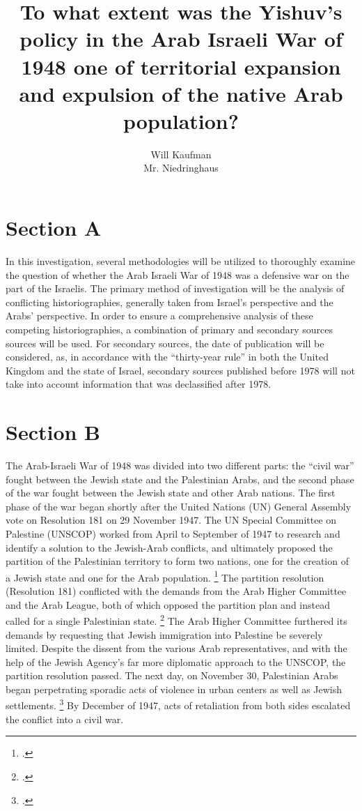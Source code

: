 \documentclass{turabian-researchpaper}
\begin{document}
\title{To what extent was the Yishuv's policy in the Arab Israeli War of 1948 one of territorial expansion and expulsion of the native Arab population?}

\author{Will Kaufman \\ Mr. Niedringhaus}
\maketitle

\section{Section A}
In this investigation, several methodologies will be utilized to thoroughly examine the question of whether the Arab Israeli War of 1948 was a defensive war on the part of the Israelis.  The primary method of investigation will be the analysis of conflicting historiographies, generally taken from Israel's perspective and the Arabs' perspective.  In order to ensure a comprehensive analysis of these competing historiographies, a combination of primary and secondary sources sources will be used.  For secondary sources, the date of publication will be considered, as, in accordance with the “thirty-year rule” in both the United Kingdom and the state of Israel, secondary sources published before 1978 will not take into account information that was declassified after 1978.

\section{Section B}
The Arab-Israeli War of 1948 was divided into two different parts: the “civil war” fought between the Jewish state and the Palestinian Arabs, and the second phase of the war fought between the Jewish state and other Arab nations.  The first phase of the war began shortly after the United Nations (UN) General Assembly vote on Resolution 181 on 29 November 1947.  The UN Special Committee on Palestine (UNSCOP) worked from April to September of 1947 to research and identify a solution to the Jewish-Arab conflicts, and ultimately proposed the partition of the Palestinian territory to form two nations, one for the creation of a Jewish state and one for the Arab population.
\footcite[22]{pappe}
The partition resolution (Resolution 181) conflicted with the demands from the Arab Higher Committee and the Arab League, both of which opposed the partition plan and instead called for a single Palestinian state.
\footcite[][23]{pappe}
The Arab Higher Committee furthered its demands by requesting that Jewish immigration into Palestine be severely limited.  Despite the dissent from the various Arab representatives, and with the help of the Jewish Agency's far more diplomatic approach to the UNSCOP, the partition resolution passed.  The next day, on November 30, Palestinian Arabs began perpetrating sporadic acts of violence in urban centers as well as Jewish settlements.
\footcite[][77]{morris}
By December of 1947, acts of retaliation from both sides escalated the conflict into a civil war.
\end{document}
